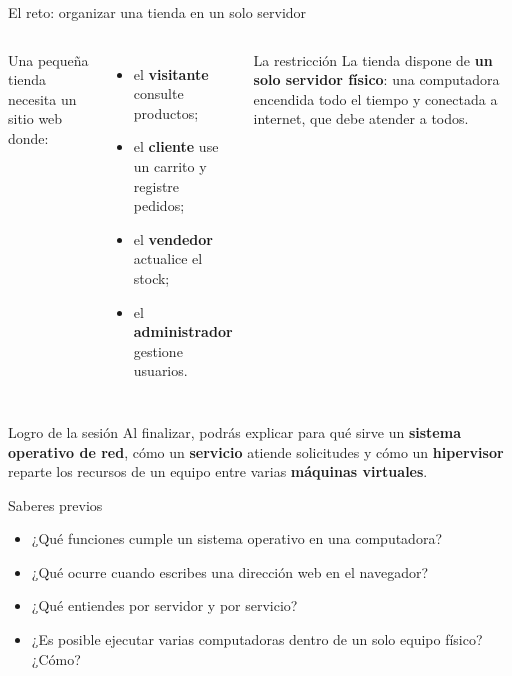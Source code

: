 \documentclass[aspectratio=169,10pt,c]{beamer}
\begin{document}
\begin{frame}{El reto: organizar una tienda en un solo servidor}
\begin{columns}[T,onlytextwidth]
  \small Una pequeña tienda necesita un sitio web donde:
  \begin{itemize}\setlength\itemsep{4pt}\small
    \item el \textbf{visitante} consulte productos;
    \item el \textbf{cliente} use un carrito y registre pedidos;
    \item el \textbf{vendedor} actualice el stock;
    \item el \textbf{administrador} gestione usuarios.
  \end{itemize}
  \vspace{0.2cm}
  \begin{alertblock}{La restricción}
  \small La tienda dispone de \textbf{un solo servidor físico}: una computadora encendida todo el tiempo y conectada a internet, que debe atender a todos.
  \end{alertblock}
  \vspace{0.6cm}
\end{columns}
\end{frame}

\begin{frame}[c]
\begin{block}{Logro de la sesión}
Al finalizar, podrás explicar para qué sirve un \textbf{sistema operativo de red}, cómo un \textbf{servicio} atiende solicitudes y cómo un \textbf{hipervisor} reparte los recursos de un equipo entre varias \textbf{máquinas virtuales}.
\end{block}
\end{frame}

\begin{frame}{Saberes previos}
\begin{itemize}\setlength\itemsep{10pt}
  \item ¿Qué funciones cumple un sistema operativo en una computadora?
  \item ¿Qué ocurre cuando escribes una dirección web en el navegador?
  \item ¿Qué entiendes por servidor y por servicio?
  \item ¿Es posible ejecutar varias computadoras dentro de un solo equipo físico? ¿Cómo?
\end{itemize}
\end{frame}
\end{document}
